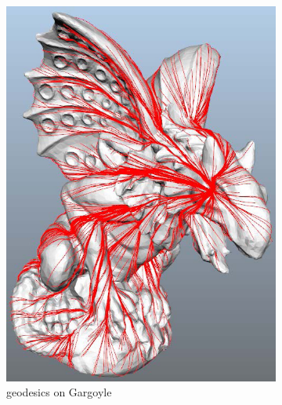 \begin{figure}
        \begin{subfigure}[b]{0.5\textwidth}
                \includegraphics[width=\textwidth]{../images/geodesic_image/gargo2-1}
                \caption{geodesics on Gargoyle}
                \label{fig:gargo}
        \end{subfigure}%
        ~ %
        \begin{subfigure}[b]{0.5\textwidth}

\end{subfigure}
\end{figure}
